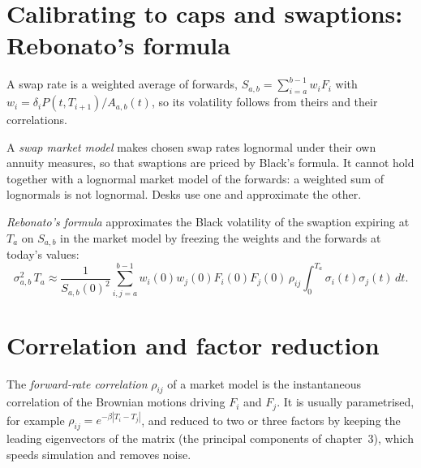 \section{Calibrating to caps and swaptions: Rebonato's formula}

A swap rate is a weighted average of forwards,
$S_{a,b}=\sum_{i=a}^{b-1}w_iF_i$ with $w_i = \delta_iP(t,T_{i+1})/A_{a,b}(t)$, so its
volatility follows from theirs and their correlations.

\begin{definition}\label{def:rc:forward-rate-and-market-models:smm}
A \emph{swap market model} makes chosen swap rates
lognormal under their own annuity measures, so that swaptions are priced by
Black's formula. It cannot hold together with a lognormal market model of the
forwards: a weighted sum of lognormals is not lognormal. Desks use one and
approximate the other.
\end{definition}

\begin{definition}\label{def:rc:forward-rate-and-market-models:rebonato}
\emph{Rebonato's formula} approximates the Black
volatility of the swaption expiring at $T_a$ on $S_{a,b}$ in the market model by
freezing the weights and the forwards at today's values:
\[
\sigma_{a,b}^2\,T_a \approx \frac1{S_{a,b}(0)^2}\sum_{i,j=a}^{b-1}
w_i(0)w_j(0)F_i(0)F_j(0)\,\rho_{ij}\int_0^{T_a}\sigma_i(t)\sigma_j(t)\,dt .
\]
\end{definition}

\label{lst:rc:forward-rate-and-market-models:rebonato}

\section{Correlation and factor reduction}

\begin{definition}\label{def:rc:forward-rate-and-market-models:corr}
The \emph{forward-rate correlation} $\rho_{ij}$ of
a market model is the instantaneous correlation of the Brownian motions
driving $F_i$ and $F_j$. It is usually parametrised, for example
$\rho_{ij} = e^{-\beta|T_i-T_j|}$, and reduced to two or three factors by keeping
the leading eigenvectors of the matrix (the principal components of
chapter~3), which speeds simulation and removes noise.
\end{definition}

